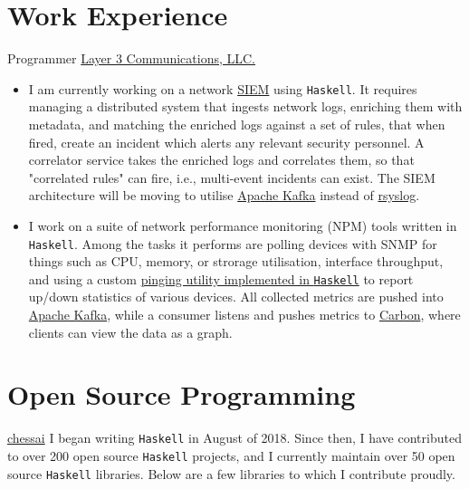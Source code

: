 \documentclass[10pt,letterpaper,sans]{moderncv}
\newcommand{\wlink}[2]{\textcolor[HTML]{461645}{\href{#1}{#2}}}
\newcommand{\lang}[1]{\texttt{#1}}
\begin{document}
\makecvtitle{}


\section{Work Experience}
        {Programmer}
        {\wlink{https://www.layer3com.com}{Layer 3 Communications, LLC.}}
        {}{}
        {
\begin{itemize}
\item I am currently working on a network \wlink{https://en.wikipedia.org/wiki/Security_information_and_event_management}{SIEM} using \lang{Haskell}. It requires managing a distributed system that ingests network logs, enriching them with metadata, and matching the enriched logs against a set of rules, that when fired, create an incident which alerts any relevant security personnel. A correlator service takes the enriched logs and correlates them, so that "correlated rules" can fire, i.e., multi-event incidents can exist. The SIEM architecture will be moving to utilise \wlink{https://kafka.apache.org/}{Apache Kafka} instead of \wlink{https://www.rsyslog.com/}{rsyslog}.
\item I work on a suite of network performance monitoring (NPM) tools written in \lang{Haskell}. Among the tasks it performs are polling devices with SNMP for things such as CPU, memory, or strorage utilisation, interface throughput, and using a custom \wlink{https://github.com/andrewthad/ping}{pinging utility implemented in \lang{Haskell}} to report up/down statistics of various devices. All collected metrics are pushed into \wlink{https://kafka.apache.org/}{Apache Kafka}, while a consumer listens and pushes metrics to \wlink{https://graphiteapp.org/}{Carbon}, where clients can view the data as a graph.
\end{itemize}
}


\section{Open Source Programming}
\cventry{}
        {\wlink{https://github.com/chessai}{chessai}}
        {}{}{}
        {
I began writing \lang{Haskell} in August of 2018. Since then, I have contributed to over 200 open source \lang{Haskell} projects, and I currently maintain over 50 open source \lang{Haskell} libraries. Below are a few libraries to which I contribute proudly.
}
\end{document}
